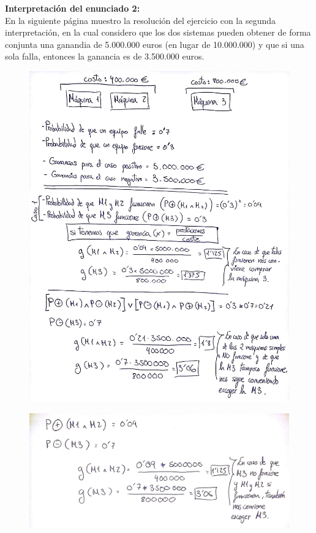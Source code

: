 \textbf{Interpretación del enunciado 2:}\\
En la siguiente página muestro la resolución del ejercicio con la segunda interpretación, en la cual considero que los dos sistemas pueden obtener de forma conjunta una ganandia de 5.000.000 euros (en lugar de 10.000.000) y que si una sola falla, entonces la ganancia es de 3.500.000 euros.

\newpage

\begin{figure}[H]
	\centering
	\includegraphics[scale=0.28]{imagenes/ej51} 
\end{figure}

\begin{figure}[H]
	\centering
	\includegraphics[scale=0.19]{imagenes/ej52} 
\end{figure}

